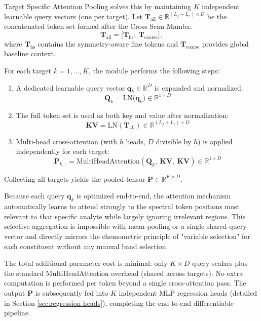 \documentclass[pdflatex,sn-mathphys-num]{sn-jnl}%
\begin{document}
Target Specific Attention Pooling solves this by maintaining $K$ independent learnable query vectors (one per target). Let $\mathbf{T}_\text{all} \in \mathbb{R}^{(L_f + L_c) \times D}$ be the concatenated token set formed after the Cross Scan Mamba:
\begin{equation}
    \mathbf{T}_\text{all} = \bigl[\mathbf{T}_\text{hs};\ \mathbf{T}_\text{coarse}\bigr],
\end{equation}
where $\mathbf{T}_\text{hs}$ contains the symmetry-aware fine tokens and $  \mathbf{T}_\text{coarse}  $ provides global baseline context.

For each target $k = 1,\dots,K$, the module performs the following steps:
\begin{enumerate}
    \item A dedicated learnable query vector $\mathbf{q}_k \in \mathbb{R}^D$ is expanded and normalized:
    \begin{equation}
        \mathbf{Q}_k = \text{LN}\bigl(\mathbf{q}_k\bigr) \in \mathbb{R}^{1 \times D}
    \end{equation}
    \item The full token set is used as both key and value after normalization:
    \begin{equation}
        \mathbf{KV} = \text{LN}(\mathbf{T}_\text{all}) \in \mathbb{R}^{(L_f + L_c) \times D}    
    \end{equation}
    \item Multi-head cross-attention (with $h$ heads, $D$ divisible by $h$) is applied independently for each target:
    \begin{equation}
        \mathbf{P}_{k,:} = \text{MultiHeadAttention}(\mathbf{Q}_k,\ \mathbf{KV},\ \mathbf{KV}) \in \mathbb{R}^{1 \times D}        
    \end{equation}
\end{enumerate}
Collecting all targets yields the pooled tensor $\mathbf{P} \in \mathbb{R}^{K \times D}$.

Because each query $\mathbf{q}_k$ is optimized end-to-end, the attention mechanism automatically learns to attend strongly to the spectral token positions most relevant to that specific analyte while largely ignoring irrelevant regions. This selective aggregation is impossible with mean pooling or a single shared query vector and directly mirrors the chemometric principle of "variable selection" for each constituent without any manual band selection.

The total additional parameter cost is minimal: only $K \times D$ query scalars plus the standard MultiHeadAttention overhead (shared across targets). No extra computation is performed per token beyond a single cross-attention pass. The output $\mathbf{P}$ is subsequently fed into $K$ independent MLP regression heads (detailed in Section \ref{sec:regression-heads}), completing the end-to-end differentiable pipeline.
\end{document}
